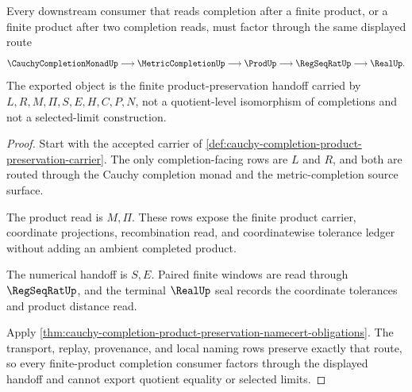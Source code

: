 \begin{theorem}
\label{thm:cauchy-completion-product-preservation-finite-product-handoff}
Every downstream consumer that reads completion after a finite product, or a finite product after two completion reads, must factor through the same displayed route
$$
\CauchyCompletionMonadUp \longrightarrow \MetricCompletionUp \longrightarrow \ProdUp \longrightarrow \RegSeqRatUp \longrightarrow \RealUp .
$$
The exported object is the finite product-preservation handoff carried by $L,R,M,\Pi,S,E,H,C,P,N$, not a quotient-level isomorphism of completions and not a selected-limit construction.
\end{theorem}
\begin{proof}
Start with the accepted carrier of \autoref{def:cauchy-completion-product-preservation-carrier}. The only completion-facing rows are $L$ and $R$, and both are routed through the Cauchy completion monad and the metric-completion source surface.

The product read is $M,\Pi$. These rows expose the finite product carrier, coordinate projections, recombination read, and coordinatewise tolerance ledger without adding an ambient completed product.

The numerical handoff is $S,E$. Paired finite windows are read through $\RegSeqRatUp$, and the terminal $\RealUp$ seal records the coordinate tolerances and product distance read.

Apply \autoref{thm:cauchy-completion-product-preservation-namecert-obligations}. The transport, replay, provenance, and local naming rows preserve exactly that route, so every finite-product completion consumer factors through the displayed handoff and cannot export quotient equality or selected limits.
\end{proof}

